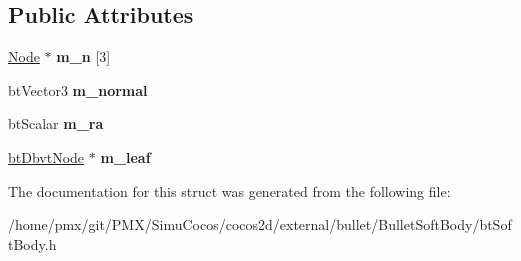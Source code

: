 \subsection*{Public Attributes}
\begin{DoxyCompactItemize}
\item 
\mbox{\label{structbtSoftBody_1_1Face_adac49d4261998d2c4c3611c104ae0f8c}} 
\hyperlink{structbtSoftBody_1_1Node}{Node} $\ast$ {\bfseries m\+\_\+n} \mbox{[}3\mbox{]}
\item 
\mbox{\label{structbtSoftBody_1_1Face_a715422a3e0a99f7dce614aec5c2baa58}} 
bt\+Vector3 {\bfseries m\+\_\+normal}
\item 
\mbox{\label{structbtSoftBody_1_1Face_a644dbb11481a1f0a54a6b1b47e29cf0a}} 
bt\+Scalar {\bfseries m\+\_\+ra}
\item 
\mbox{\label{structbtSoftBody_1_1Face_ae0dce3a9981dc191dc4b0ff917239621}} 
\hyperlink{structbtDbvtNode}{bt\+Dbvt\+Node} $\ast$ {\bfseries m\+\_\+leaf}
\end{DoxyCompactItemize}


The documentation for this struct was generated from the following file\+:\begin{DoxyCompactItemize}
\item 
/home/pmx/git/\+P\+M\+X/\+Simu\+Cocos/cocos2d/external/bullet/\+Bullet\+Soft\+Body/bt\+Soft\+Body.\+h\end{DoxyCompactItemize}
